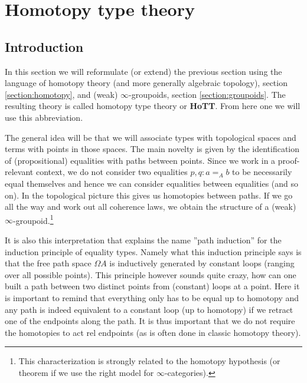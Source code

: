 \section{Homotopy type theory}
\subsection{Introduction}

    In this section we will reformulate (or extend) the previous section using the language of homotopy theory (and more generally algebraic topology), section \ref{section:homotopy}, and (weak) $\infty$-groupoids, section \ref{section:groupoids}. The resulting theory is called homotopy type theory or \textbf{HoTT}. From here one we will use this abbreviation.

    The general idea will be that we will associate types with topological spaces and terms with points in those spaces. The main novelty is given by the identification of (propositional) equalities with paths between points. Since we work in a proof-relevant context, we do not consider two equalities $p,q:a=_Ab$ to be necessarily equal themselves and hence we can consider equalities between equalities (and so on). In the topological picture this gives us homotopies between paths. If we go all the way and work out all coherence laws, we obtain the structure of a (weak) $\infty$-groupoid.\footnote{This characterization is strongly related to the homotopy hypothesis (or theorem if we use the right model for $\infty$-categories).}

    It is also this interpretation that explains the name ''path induction'' for the induction principle of equality types. Namely what this induction principle says is that the free path space $\Omega A$ is inductively generated by constant loops (ranging over all possible points). This principle however sounds quite crazy, how can one built a path between two distinct points from (constant) loops at a point. Here it is important to remind that everything only has to be equal up to homotopy and any path is indeed equivalent to a constant loop (up to homotopy) if we retract one of the endpoints along the path. It is thus important that we do not require the homotopies to act rel endpoints (as is often done in classic homotopy theory).


